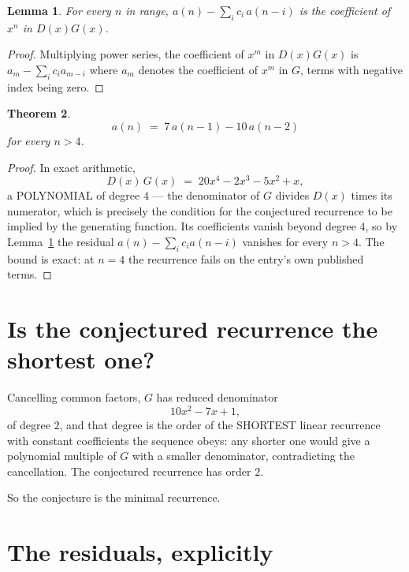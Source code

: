 \documentclass[11pt,a4paper]{article}
\theoremstyle{plain}
\newtheorem{theorem}{Theorem}
\newtheorem{lemma}[theorem]{Lemma}
\theoremstyle{definition}
\begin{document}
\begin{lemma}\label{lem:key}
For every $n$ in range, $a(n)-\sum_i c_i\,a(n-i)$ is the coefficient of $x^{n}$ in
$D(x)G(x)$.
\end{lemma}

\begin{proof}
Multiplying power series, the coefficient of $x^{m}$ in $D(x)G(x)$ is
$a_m-\sum_i c_i a_{m-i}$ where $a_m$ denotes the coefficient of $x^{m}$ in $G$, terms with
negative index being zero.
\end{proof}

\begin{theorem}
\[
a(n)\;=\;7\,a(n-1) - 10\,a(n-2)
\]
for every $n>4$.
\end{theorem}

\begin{proof}
In exact arithmetic,
\[
D(x)\,G(x)\;=\;20 x^{4} - 2 x^{3} - 5 x^{2} + x,
\]
a POLYNOMIAL of degree $4$ --- the denominator of $G$ divides $D(x)$ times its numerator,
which is precisely the condition for the conjectured recurrence to be implied by the
generating function. Its coefficients vanish beyond degree $4$, so by
Lemma~\ref{lem:key} the residual $a(n)-\sum_ic_ia(n-i)$ vanishes for every
$n>4$. The bound is exact: at $n=4$ the recurrence fails on the entry's own published terms.
\end{proof}

\section{Is the conjectured recurrence the shortest one?}

Cancelling common factors, $G$ has reduced denominator
\[
10 x^{2} - 7 x + 1,
\]
of degree $2$, and that degree is the order of the SHORTEST linear recurrence with
constant coefficients the sequence obeys: any shorter one would give a polynomial multiple of
$G$ with a smaller denominator, contradicting the cancellation. The conjectured recurrence has
order $2$.

So the conjecture is the minimal recurrence.

\section{The residuals, explicitly}
\end{document}
